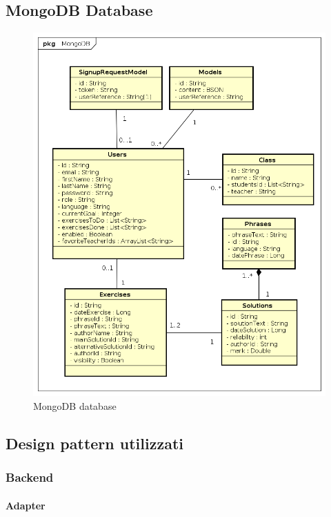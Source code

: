 \subsection{MongoDB Database}
\begin{figure}[H]
\centering
\includegraphics[width=17cm, keepaspectratio]{img/mongodb.png} 
\caption{MongoDB database}
\end{figure}
\newpage

\subsection{Design pattern utilizzati}
\subsubsection{Backend}
\paragraph{Adapter}\mbox{}\\

